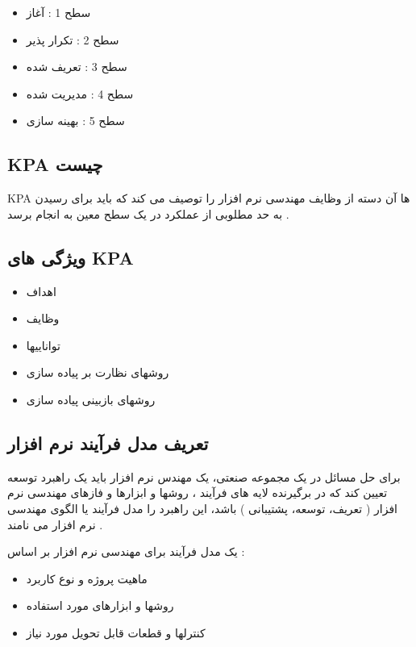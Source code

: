 \documentclass{article}
\begin{document}
\begin{itemize}
	\item سطح 1 : آغاز
	\item سطح 2 : تکرار پذیر
	\item سطح 3 : تعریف شده
	\item سطح 4 : مدیریت شده
	\item سطح 5 : بهینه سازی
\end{itemize}







\subsection{KPA چیست}

KPA ها آن دسته از وظایف مهندسی نرم افزار را توصیف می کند که باید برای رسیدن به حد مطلوبی از عملکرد در یک سطح معین به انجام برسد .


\subsection{ویژگی های KPA}

\begin{itemize}
	\item اهداف
	\item وظایف
	\item تواناییها
	\item روشهای نظارت بر پیاده سازی
	\item روشهای بازبینی پیاده سازی
\end{itemize}


\subsection{ تعریف مدل فرآیند نرم افزار}

برای حل مسائل در یک مجموعه صنعتی، یک مهندس نرم افزار باید یک راهبرد توسعه تعیین کند که در برگیرنده لایه های فرآیند ، روشها و ابزارها و فازهای مهندسی نرم افزار ( تعریف، توسعه، پشتیبانی ) باشد، این راهبرد را مدل فرآیند یا الگوی مهندسی نرم افزار می نامند .

یک مدل فرآیند برای مهندسی نرم افزار بر اساس :

\begin{itemize}
	\item ماهیت پروژه و نوع کاربرد
	\item روشها و ابزارهای مورد استفاده
	\item کنترلها و قطعات قابل تحویل مورد نیاز
\end{itemize}
\end{document}

